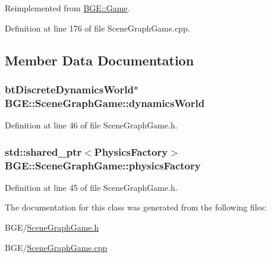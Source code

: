 Reimplemented from \hyperlink{class_b_g_e_1_1_game_a51ed573392d7bed791b67062e7c7a3d4}{B\-G\-E\-::\-Game}.



Definition at line 176 of file Scene\-Graph\-Game.\-cpp.



\subsection{Member Data Documentation}
\hypertarget{class_b_g_e_1_1_scene_graph_game_a45b47315f225ce7f276561108d6cb0e7}{
\subsubsection[{dynamics\-World}]{\setlength{\rightskip}{0pt plus 5cm}bt\-Discrete\-Dynamics\-World$\ast$ B\-G\-E\-::\-Scene\-Graph\-Game\-::dynamics\-World}}\label{class_b_g_e_1_1_scene_graph_game_a45b47315f225ce7f276561108d6cb0e7}


Definition at line 46 of file Scene\-Graph\-Game.\-h.

\hypertarget{class_b_g_e_1_1_scene_graph_game_a50dc4ff0c63594495ca6fc5fa4441603}{
\subsubsection[{physics\-Factory}]{\setlength{\rightskip}{0pt plus 5cm}std\-::shared\-\_\-ptr$<${\bf Physics\-Factory}$>$ B\-G\-E\-::\-Scene\-Graph\-Game\-::physics\-Factory}}\label{class_b_g_e_1_1_scene_graph_game_a50dc4ff0c63594495ca6fc5fa4441603}


Definition at line 45 of file Scene\-Graph\-Game.\-h.



The documentation for this class was generated from the following files\-:\begin{DoxyCompactItemize}
\item 
B\-G\-E/\hyperlink{_scene_graph_game_8h}{Scene\-Graph\-Game.\-h}\item 
B\-G\-E/\hyperlink{_scene_graph_game_8cpp}{Scene\-Graph\-Game.\-cpp}\end{DoxyCompactItemize}
